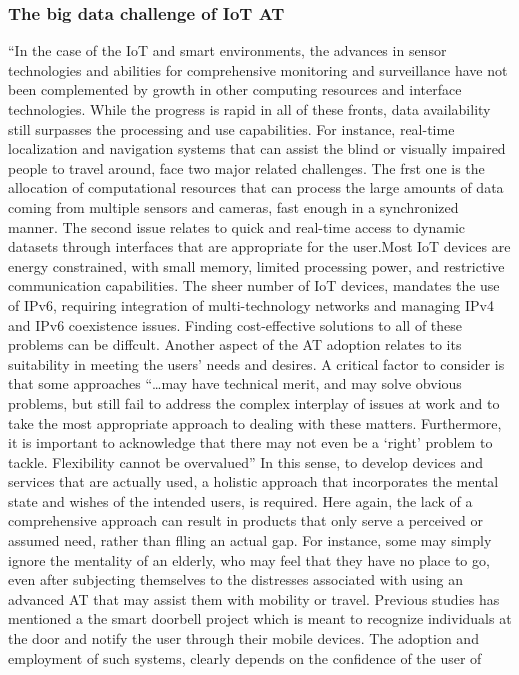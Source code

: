 \subsubsection{The big data challenge of IoT AT}
``In the case of the IoT and smart
environments, the advances in sensor technologies and abilities for comprehensive
monitoring and surveillance have not been complemented by growth in other computing resources and interface technologies. While the progress is rapid in all of
these fronts, data availability still surpasses the processing and use capabilities. For
instance, real-time localization and navigation systems that can assist the blind or
visually impaired people to travel around, face two major related challenges. The
frst one is the allocation of computational resources that can process the large
amounts of data coming from multiple sensors and cameras, fast enough in a synchronized manner. The second issue relates to quick and real-time access to
dynamic datasets through interfaces that are appropriate for the user.Most IoT devices are
energy constrained, with small memory, limited processing power, and restrictive
communication capabilities. The sheer number of IoT devices, mandates the use of
IPv6, requiring integration of multi-technology networks and managing IPv4 and
IPv6 coexistence issues. Finding cost-effective solutions to all of these problems can be diffcult.
Another aspect of the AT adoption relates to its suitability in meeting the users’
needs and desires. A critical factor to consider is that some approaches ``…may have
technical merit, and may solve obvious problems, but still fail to address the complex
interplay of issues at work and to take the most appropriate approach to dealing with
these matters. Furthermore, it is important to acknowledge that there may not even
be a ‘right’ problem to tackle. Flexibility cannot be overvalued'' In this
sense, to develop devices and services that are actually used, a holistic approach that
incorporates the mental state and wishes of the intended users, is required. Here
again, the lack of a comprehensive approach can result in products that only serve a
perceived or assumed need, rather than flling an actual gap. For instance, some may
simply ignore the mentality of an elderly, who may feel that they have no place to go,
even after subjecting themselves to the distresses associated with using an advanced
AT that may assist them with mobility or travel. Previous studies has mentioned a
the smart doorbell project which is meant to recognize
individuals at the door and notify the user through their mobile devices. The adoption and employment of such systems, clearly depends on the confidence of the user of
